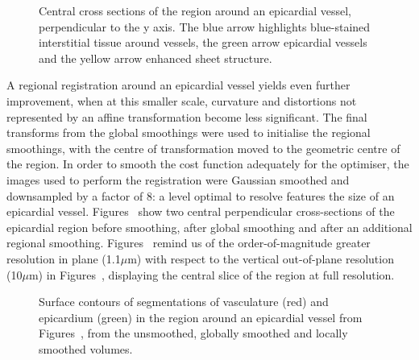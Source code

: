       \begin{figure}[p]
        \caption{Central cross sections of the region around an epicardial vessel, perpendicular to the y axis.  The blue arrow highlights blue-stained interstitial tissue around vessels, the green arrow epicardial vessels and the yellow arrow enhanced sheet structure.}
      \end{figure}
    
    
      A regional registration around an epicardial vessel yields even further improvement, when at this smaller scale, curvature and distortions not represented by an affine transformation become less significant. The final transforms from the global smoothings were used to initialise the regional smoothings, with the centre of transformation moved to the geometric centre of the region. In order to smooth the cost function adequately for the optimiser, the images used to perform the registration were Gaussian smoothed and downsampled by a factor of 8: a level optimal to resolve features the size of an epicardial vessel. Figures~ show two central perpendicular cross-sections of the epicardial region before smoothing, after global smoothing and after an additional regional smoothing. Figures~ remind us of the order-of-magnitude greater resolution in plane (1.1$\mu$m) with respect to the vertical out-of-plane resolution (10$\mu$m) in Figures~, displaying the central slice of the region at full resolution.
    
      \begin{figure}[p]
        \caption{Surface contours of segmentations of vasculature (red) and epicardium (green) in the region around an epicardial vessel from Figures~, from the unsmoothed, globally smoothed and locally smoothed volumes.}
      \end{figure}
    
